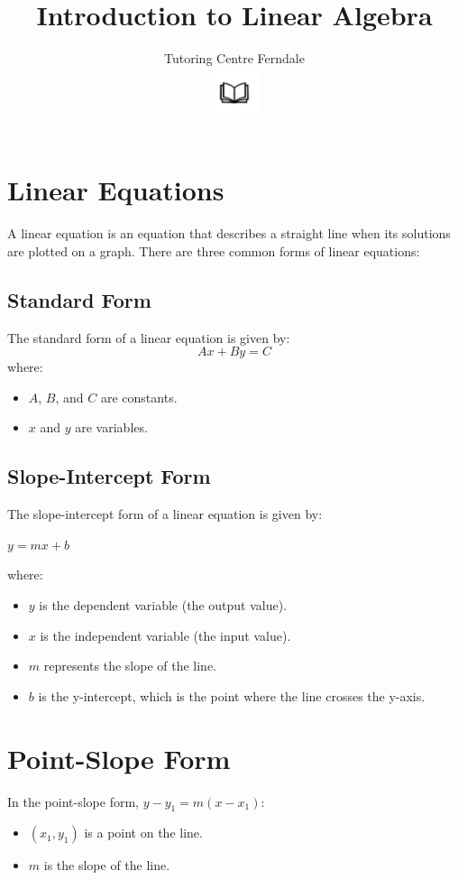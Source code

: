 \documentclass[12pt]{article}
\title{Introduction to Linear Algebra}\\
\author{Tutoring Centre Ferndale\\
\includegraphics[width=4em]{ApS_logo.png}}
\date{}
\begin{document}
\maketitle

\section*{Linear Equations}

A linear equation is an equation that describes a straight line when its solutions are plotted on a graph. There are three common forms of linear equations:

\subsection*{Standard Form}

The standard form of a linear equation is given by:
\[
Ax + By = C
\]
where:
\begin{itemize}
    \item \( A \), \( B \), and \( C \) are constants.
    \item \( x \) and \( y \) are variables.
\end{itemize}

\subsection*{Slope-Intercept Form}

The slope-intercept form of a linear equation is given by:

$y = mx + b$

where:
\begin{itemize}
    \item \( y \) is the dependent variable (the output value).
    \item \( x \) is the independent variable (the input value).
    \item \( m \) represents the slope of the line.
    \item \( b \) is the y-intercept, which is the point where the line crosses the y-axis.
\end{itemize}

\section*{Point-Slope Form}

In the point-slope form, \(y - y_1 = m(x - x_1)\):
\begin{itemize}
    \item \((x_1, y_1)\) is a point on the line.
    \item \(m\) is the slope of the line.
\end{itemize}
\end{document}
